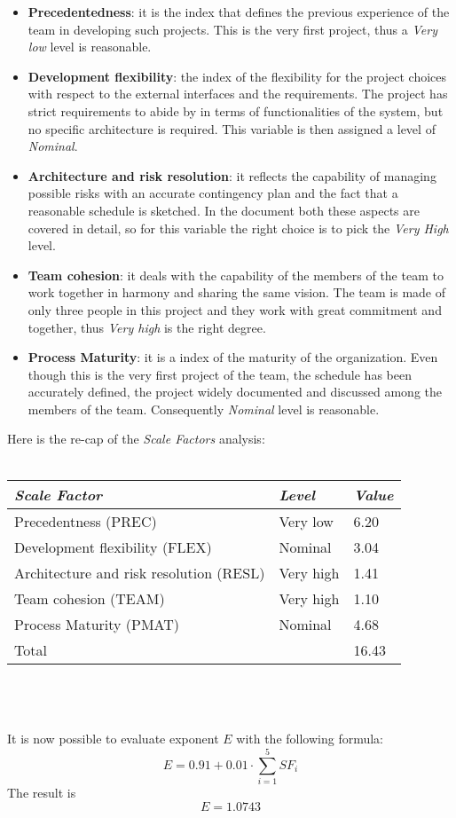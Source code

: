 \documentclass[11pt,a4paper]{report}
\begin{document}
\begin{itemize}
	\item \textbf{Precedentedness}: it is the index that defines the previous experience of the team in developing such projects. This is the very first project, thus a \textit{Very low} level is reasonable.
	\item \textbf{Development flexibility}: the index of the flexibility for the project choices with respect to the external interfaces and the requirements. The project has strict requirements to abide by in terms of functionalities of the system, but no specific architecture is required. This variable is then assigned a level of \textit{Nominal}.
	\item \textbf{Architecture and risk resolution}: it reflects the capability of managing possible risks with an accurate contingency plan and the fact that a reasonable schedule is sketched. In the document both these aspects are covered in detail, so for this variable the right choice is to pick the \textit{Very High} level.
	\item \textbf{Team cohesion}: it deals with the capability of the members of the team to work together in harmony and sharing the same vision. The team is made of only three people in this project and they work with great commitment and together, thus \textit{Very high} is the right degree.
	\item \textbf{Process Maturity}: it is a index of the maturity of the organization. Even though this is the very first project of the team, the schedule has been accurately defined, the project widely documented and discussed among the members of the team. Consequently \textit{Nominal} level is reasonable.
\end{itemize}
Here is the re-cap of the \textit{Scale Factors} analysis:
\\\\
\begin{tabularx}{\textwidth}{|p{8cm}|X|X|}
	\hline
	\textit{Scale Factor} & \textit{Level} & \textit{Value}\\
	\hline
	Precedentness (PREC) & Very low & 6.20\\
	Development flexibility (FLEX) & Nominal & 3.04\\
	Architecture and risk resolution (RESL) & Very high & 1.41\\
	Team cohesion (TEAM) & Very high & 1.10\\
	Process Maturity (PMAT) & Nominal & 4.68\\
	\hline
	Total &  & 16.43\\
	\hline
\end{tabularx}\\\\\\
It is now possible to evaluate exponent $E$ with the following formula:
$$E = 0.91+0.01 \cdot \sum_{i=1}^5 SF_i$$
The result is 
$$E = 1.0743$$
\end{document}
